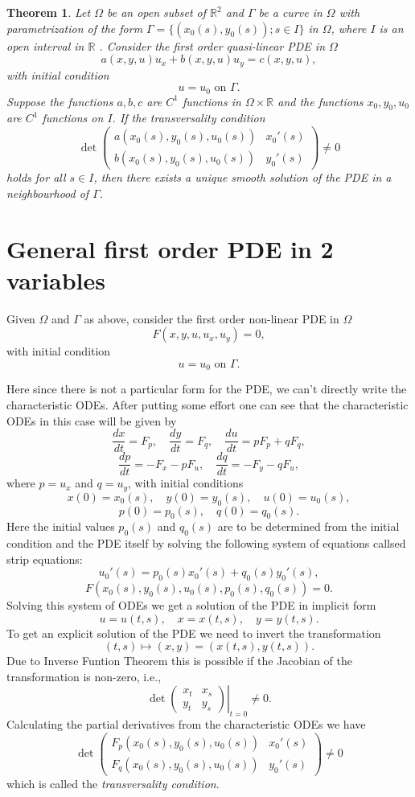 \documentclass[12pt]{exam}
\newtheorem{theorem}{Theorem}
\begin{document}
	\begin{theorem}
		Let $\Omega$ be an open subset of $\mathbb{R}^2$ and $\Gamma$ be a curve in $\Omega$ with parametrization of the form $\Gamma=\{(x_0(s),y_0(s));s\in I\}$ in $\Omega$, where $I$ is an open interval in $\mathbb{R}$ . Consider the first order quasi-linear PDE in $\Omega$
		\[a(x,y,u)u_x + b(x,y,u)u_y = c(x,y,u),\]
		with initial condition
		\[u=u_0 \text{ on } \Gamma.\]
		Suppose the functions \( a, b, c \) are $C^1$ functions in $\Omega \times \mathbb{R}$ and the functions \( x_0, y_0, u_0\) are $C^1$ functions on $I$. If the transversality condition
		\[\det \begin{pmatrix}
			a(x_0(s),y_0(s),u_0(s)) & x_0'(s) \\
			b(x_0(s),y_0(s),u_0(s)) & y_0'(s)
			\end{pmatrix} \neq 0\]
		holds for all \( s \in I \), then there exists a unique smooth solution of the PDE in a neighbourhood of $\Gamma$.
	\end{theorem}

	\section{General first order PDE in 2 variables}

	Given $\Omega$ and $\Gamma$ as above, consider the first order non-linear PDE in $\Omega$
	\[F(x,y,u,u_x,u_y) = 0,\]
	with initial condition
	\[u=u_0 \text{ on } \Gamma.\]	

	Here since there is not a particular form for the PDE, we can't directly write the characteristic ODEs. After putting some effort one can see that the characteristic ODEs in this case will be given by
	\[\frac{dx}{dt} = F_p, \quad \frac{dy}{dt} = F_q, \quad \frac{du}{dt} = pF_p + qF_q,\]
	\[\frac{dp}{dt} = -F_x - pF_u, \quad \frac{dq}{dt} = -F_y - qF_u,\]
	where \( p = u_x \) and \( q = u_y \), with initial conditions
	\[x(0) = x_0(s), \quad y(0) = y_0(s), \quad u(0) = u_0(s),\]
	\[p(0) = p_0(s), \quad q(0) = q_0(s).\]
	Here the initial values \( p_0(s) \) and \( q_0(s) \) are to be determined from the initial condition and the PDE itself by solving the following system of equations callsed strip equations:
	\[u_0'(s) = p_0(s)x_0'(s) + q_0(s)y_0'(s),\]
	\[F(x_0(s),y_0(s),u_0(s),p_0(s),q_0(s)) = 0.\]
	Solving this system of ODEs we get a solution of the PDE in implicit form
	\[u = u(t,s), \quad x = x(t,s), \quad y = y(t,s).\]
	To get an explicit solution of the PDE we need to invert the transformation
	\[(t,s) \mapsto (x,y) = (x(t,s), y(t,s)).\]
	Due to Inverse Funtion Theorem this is possible if the Jacobian of the transformation is non-zero, i.e.,
	\[\det \left.\begin{pmatrix}
		x_t & x_s \\
		y_t & y_s
		\end{pmatrix}\right|_{t=0} \neq 0.\]
	Calculating the partial derivatives from the characteristic ODEs we have
	\[\det \begin{pmatrix}
		F_p(x_0(s),y_0(s),u_0(s)) & x_0'(s) \\
		F_q(x_0(s),y_0(s),u_0(s)) & y_0'(s)
		\end{pmatrix} \neq 0\]
	which is called the \textit{transversality condition}.
\end{document}
